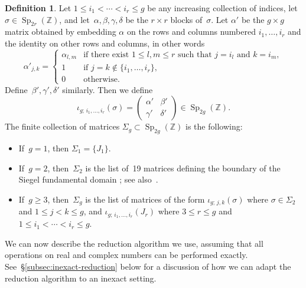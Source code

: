 \documentclass[12pt,oneside]{amsart}
\numberwithin{equation}{section}
\theoremstyle{definition}
\newtheorem{defn}[equation]{Definition}
\newcommand{\Z}{\mathbb{Z}}
\newcommand{\embedsp}[2]{\iota_{#1;\,#2}}
\DeclareMathOperator{\Sp}{Sp}
\begin{document}
\begin{defn}
  \label{def:sp-embed} Let $1\leq i_1 < \cdots < i_r \leq g$ be any increasing
  collection of indices, let~$\sigma \in \Sp_{2r}(\Z)$, and
  let~$\alpha,\beta,\gamma,\delta$ be the $r\times r$ blocks of~$\sigma$. Let
  $\alpha'$ be the $g\times g$ matrix obtained by embedding $\alpha$ on the
  rows and columns numbered $i_1,\ldots,i_r$ and the identity on other rows and
  columns, in other words
  \begin{displaymath}
    \alpha'_{j,k} = \begin{cases} \alpha_{l,m} & \text{if there exist $1\leq l,m\leq r$ such that
                                                 $j = i_l$ and $k = i_m$},\\
      1 &\text{if } j = k \notin \{i_1,\ldots,i_r\},\\
      0 & \text{otherwise.}
    \end{cases}
  \end{displaymath}
  Define~$\beta',\gamma',\delta'$ similarly. Then we define
  \begin{displaymath}
    \embedsp{g}{i_1,\ldots,i_r}(\sigma)
    = \begin{pmatrix} \alpha' & \beta' \\ \gamma' & \delta'
    \end{pmatrix} \in \Sp_{2g}(\Z).
  \end{displaymath}
  The finite collection of matrices $\Sigma_g\subset \Sp_{2g}(\Z)$ is the following:
  \begin{itemize}
  \item If~$g=1$, then $\Sigma_1= \{J_1\}$.
  \item If~$g=2$, then~$\Sigma_2$ is the list of~19 matrices defining the
    boundary of the Siegel fundamental domain
    \cite{gottschlingExpliziteBestimmungRandflaechen1959}; see
    also~\cite[§2.1]{frauendienerEfficientComputationMultidimensional2019}.
  \item If~$g\geq 3$, then~$\Sigma_g$ is the list of matrices of the form
    $\embedsp{g}{j,k}(\sigma)$ where $\sigma\in \Sigma_2$ and
    $1\leq j < k\leq g$, and $\embedsp{g}{i_1,\ldots,i_r}(J_r)$ where
    $3\leq r\leq g$ and $1\leq i_1 < \cdots < i_r\leq g$.
  \end{itemize}
\end{defn}

We can now describe the reduction algorithm we use, assuming that all
operations on real and complex numbers can be performed exactly.
See~§\ref{subsec:inexact-reduction} below for a discussion of how we can adapt
the reduction algorithm to an inexact setting.
\end{document}
